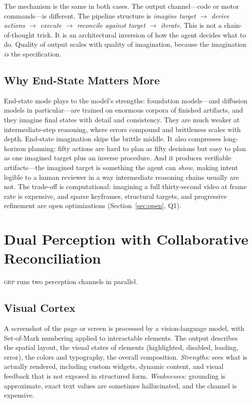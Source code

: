 \documentclass[12pt]{article}
\theoremstyle{definition}
\theoremstyle{remark}
\newcommand{\grp}{\textsc{grp}}
\begin{document}
The mechanism is the same in both cases. The output channel---code or
motor commands---is different. The pipeline structure is
\emph{imagine target $\to$ derive actions $\to$ execute $\to$
reconcile against target $\to$ iterate}. This is not a chain-of-thought
trick. It is an architectural inversion of how the agent decides what
to do. Quality of output scales with quality of imagination, because
the imagination \emph{is} the specification.

\subsection{Why End-State Matters More}
\label{subsec:why-end-state}

End-state mode plays to the model's strengths: foundation models---and
diffusion models in particular---are trained on enormous corpora of
finished artifacts, and they imagine final states with detail and
consistency. They are much weaker at intermediate-step reasoning, where
errors compound and brittleness scales with depth. End-state imagination
skips the brittle middle. It also compresses long-horizon planning:
fifty actions are hard to plan as fifty decisions but easy to plan as
one imagined target plus an inverse procedure. And it produces
verifiable artifacts---the imagined target is something the agent can
\emph{show}, making intent legible to a human reviewer in a way
intermediate reasoning chains usually are not. The trade-off is
computational: imagining a full thirty-second video at frame rate is
expensive, and sparse keyframes, structural targets, and progressive
refinement are open optimizations (Section~\ref{sec:open}, Q1).

\section{Dual Perception with Collaborative Reconciliation}
\label{sec:dual}

\grp{} runs two perception channels in parallel.

\subsection{Visual Cortex}
A screenshot of the page or screen is processed by a vision-language
model, with Set-of-Mark numbering applied to interactable elements.
The output describes the spatial layout, the visual states of
elements (highlighted, disabled, loading, error), the colors and
typography, the overall composition. \emph{Strengths:} sees what is
actually rendered, including custom widgets, dynamic content, and
visual feedback that is not exposed in structured form.
\emph{Weaknesses:} grounding is approximate, exact text values are
sometimes hallucinated, and the channel is expensive.
\end{document}
